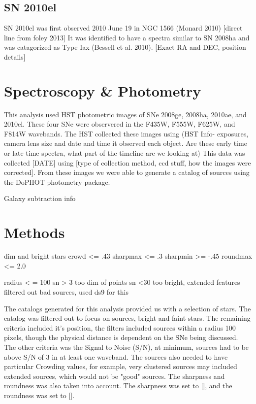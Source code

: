 \documentclass[preprint2]{aastex}
\begin{document}
\subsection{SN 2010el}
SN 2010el was first observed 2010 June 19 in NGC 1566
(Monard 2010) [direct line from foley 2013]
It was identified to have a spectra similar to SN 2008ha and was 
catagorized as Type Iax (Bessell et al. 2010).
[Exact RA and DEC, position details]

\section{Spectroscopy \& Photometry}

This analysis used HST photometric images of SNe 2008ge, 2008ha, 
2010ae, and 2010el. 
These four SNe were observered in the F435W, F555W, F625W, 
and F814W wavebands. 
The HST collected these images using (HST Info- exposures, camera lens size 
and date and time it observed each object.
Are these early time or late time spectra, what part of the timeline are we 
looking at)
This data was collected [DATE] using [type of collection method, ccd stuff,
how the images were corrected]. 
From these images we were able to generate a catalog of sources using the
DoPHOT photometry package. 

Galaxy subtraction info


\section{Methods}
dim and bright stars
crowd <= .43 
sharpmax <=   .3 
sharpmin >= -.45
roundmax <=   2.0

radius < = 100
sn > 3 too dim of points
sn <30 too bright, extended features
filtered out bad sources, used ds9 for this

The catalogs generated for this analysis provided us with a selection of stars.
The catalog  was filtered out to focus on sources, bright and faint stars.
The remaining criteria included it's position, the filters included sources within a radius 
100 pixels, though the physical distance is dependent on the SNe being discussed. 
The other criteria was the Signal to Noise (S/N), at minimum, 
sources had to be above S/N of 3 in at least one waveband. 
The sources also needed to have particular Crowding values, for example, 
very clustered sources may included extended sources, which would not be "good" 
sources. The sharpness and roundness was also taken into account. 
The sharpness was set to [], and the roundness was set to []. 
\end{document}
